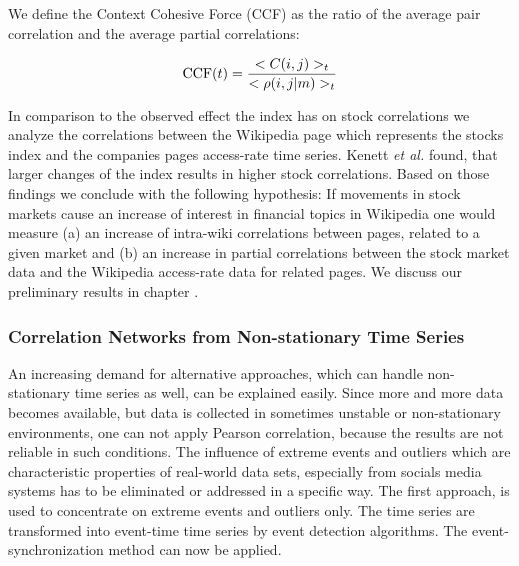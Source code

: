 \documentclass[a4paper,10pt]{scrbook}
\begin{document}
We define the Context Cohesive Force (CCF) as the ratio of the average pair correlation and the average partial correlations: 

 
\begin{equation}
{\rm CCF}(t)=\frac{<C(i,j)>_t }{<\rho(i,j|m)>_t}  
\label{eq.CCF} 
\end{equation}

In comparison to the observed effect the index has on stock correlations we analyze the correlations between the Wikipedia page which represents the stocks index and the companies pages access-rate time series. Kenett \textit{et al.} found, that larger changes of the index results in higher stock correlations. Based on those findings we conclude with the following hypothesis: If movements in stock markets cause an increase of interest in financial topics in Wikipedia one would measure (a) an increase of intra-wiki correlations between pages, related to a given market and (b) an increase in partial correlations between the stock market data and the Wikipedia access-rate data for related pages. We discuss our preliminary results in chapter \label{RESULTS}. 


 
\subsubsection{Correlation Networks from Non-stationary Time Series}


An increasing demand for alternative approaches, which can handle non-stationary time series as well, can be explained easily. Since more and more data becomes available, but data is collected in sometimes unstable or non-stationary environments, one can not apply Pearson correlation, because the results are not reliable in such conditions. The influence of extreme events and outliers which are characteristic properties of real-world data sets, especially from socials media systems has to be eliminated or addressed in a specific way. The first approach, is used to concentrate on extreme events and outliers only. The time series are transformed into event-time time series by event detection algorithms. The event-synchronization method can now be applied. 
\end{document}
